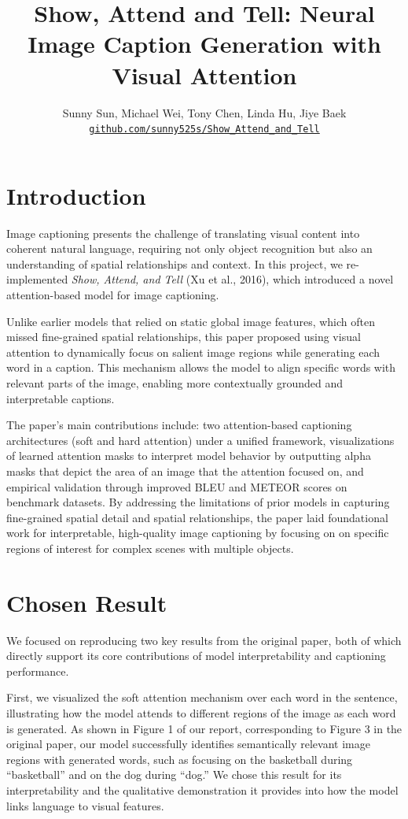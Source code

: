 \documentclass{article}
\title{Show, Attend and Tell: Neural Image Caption Generation with Visual Attention}
\author{Sunny Sun, Michael Wei, Tony Chen, Linda Hu, Jiye Baek \\
  \href{https://github.com/sunny525s/Show_Attend_and_Tell}
    {\texttt{github.com/sunny525s/Show\_Attend\_and\_Tell}}}
\date{}
\begin{document}
\maketitle

\vspace{-5em}
\section{Introduction}

Image captioning presents the challenge of translating visual content into coherent natural language, requiring not only object recognition but also an understanding of spatial relationships and context. In this project, we re-implemented \textit{Show, Attend, and Tell} (Xu et al., 2016), which introduced a novel attention-based model for image captioning.

Unlike earlier models that relied on static global image features, which often missed fine-grained spatial relationships, this paper proposed using visual attention to dynamically focus on salient image regions while generating each word in a caption. This mechanism allows the model to align specific words with relevant parts of the image, enabling more contextually grounded and interpretable captions.

The paper’s main contributions include: two attention-based captioning architectures (soft and hard attention) under a unified framework, visualizations of learned attention masks to interpret model behavior by outputting alpha masks that depict the area of an image that the attention focused on, and empirical validation through improved BLEU and METEOR scores on benchmark datasets. By addressing the limitations of prior models in capturing fine-grained spatial detail and spatial relationships, the paper laid foundational work for interpretable, high-quality image captioning by focusing on on specific regions of interest for complex scenes with multiple objects.

\section{Chosen Result}
We focused on reproducing two key results from the original paper, both of which directly support its core contributions of model interpretability and captioning performance.

First, we visualized the soft attention mechanism over each word in the sentence, illustrating how the model attends to different regions of the image as each word is generated. As shown in Figure 1 of our report, corresponding to Figure 3 in the original paper, our model successfully identifies semantically relevant image regions with generated words, such as focusing on the basketball during “basketball” and on the dog during “dog.” We chose this result for its interpretability and the qualitative demonstration it provides into how the model links language to visual features.
\end{document}
